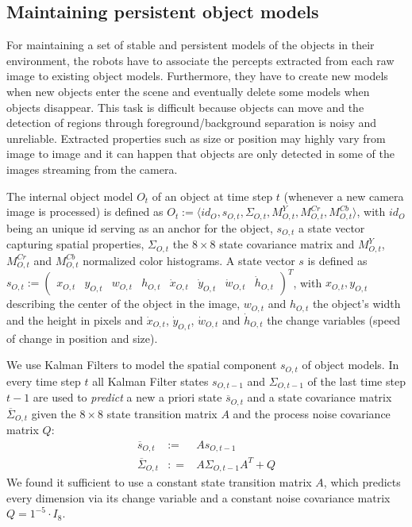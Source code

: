 \subsection{Maintaining persistent object models}
\label{s:object-models}

For maintaining a set of stable and persistent models of the objects
in their environment, the robots have to associate the percepts
extracted from each raw image to existing object models. Furthermore,
they have to create new models when new objects enter the scene and
eventually delete some models when objects disappear. This task is
difficult because objects can move and the detection of regions
through foreground/background separation is noisy and
unreliable. Extracted properties such as size or position may highly
vary from image to image and it can happen that objects are only
detected in some of the images streaming from the camera.


The internal object model $O_t$ of an object at time step $t$
(whenever a new camera image is processed) is defined as $O_t:=\langle
id_O,s_{O,t},\Sigma_{O,t},M^Y_{O,t},M^{Cr}_{O,t},M^{Cb}_{O,t}\rangle$,
with $id_{O}$ being an unique id serving as an anchor for the object,
$s_{O,t}$ a state vector capturing spatial properties, $\Sigma_{O,t}$
the $8 \times 8$ state covariance matrix and $M_{O,t}^Y$,
$M_{O,t}^{Cr}$ and $M_{O,t}^{Cb}$ normalized color histograms. A state
vector $s$ is defined as $s_{O,t}:=\begin{pmatrix} x_{O,t} & y_{O,t} &
  w_{O,t} & h_{O,t} & \dot{x}_{O,t} & \dot{y}_{O,t} & \dot{w}_{O,t} &
  \dot{h}_{O,t}\end{pmatrix}^T$, with $x_{O,t},y_{O,t}$ describing the
center of the object in the image, $w_{O,t}$ and $h_{O,t}$ the
object's width and the height in pixels and $\dot{x}_{O,t}$,
$\dot{y}_{O,t}$, $\dot{w}_{O,t}$ and $\dot{h}_{O,t}$ the change
variables (speed of change in position and size).

We use Kalman Filters \citep{kalman60new} to model the spatial
component $s_{O,t}$ of object models. In every time step $t$ all Kalman
Filter states $s_{O,t-1}$ and $\Sigma_{O,t-1}$ of the last time step $t-1$
are used to \emph{predict} a new a priori state $\overline{s}_{O,t}$ and a
state covariance matrix $\overline{\Sigma}_{O,t}$ given the $8\times8$
state transition matrix $A$ and the process noise covariance matrix
$Q$:
\begin{eqnarray*}
\overline{s}_{O,t}&:=&As_{O,t-1} \\ 
\overline{\Sigma}_{O,t}&: =& A \Sigma_{O,t-1} A^T+Q
\end{eqnarray*}
We found it sufficient to use a constant state transition matrix $A$,
which predicts every dimension via its change variable
and a constant noise covariance matrix $Q=1^{-5}\cdot I_8$.

